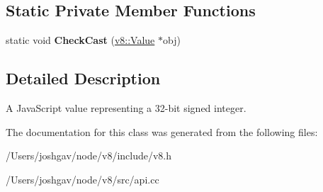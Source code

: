 \subsection*{Static Private Member Functions}
\begin{DoxyCompactItemize}
\item 
static void {\bfseries Check\+Cast} (\hyperlink{classv8_1_1_value}{v8\+::\+Value} $\ast$obj)\hypertarget{classv8_1_1_int32_a950badcc6761d8a92a8daf7e20bc40ff}{}\label{classv8_1_1_int32_a950badcc6761d8a92a8daf7e20bc40ff}

\end{DoxyCompactItemize}


\subsection{Detailed Description}
A Java\+Script value representing a 32-\/bit signed integer. 

The documentation for this class was generated from the following files\+:\begin{DoxyCompactItemize}
\item 
/\+Users/joshgav/node/v8/include/v8.\+h\item 
/\+Users/joshgav/node/v8/src/api.\+cc\end{DoxyCompactItemize}
